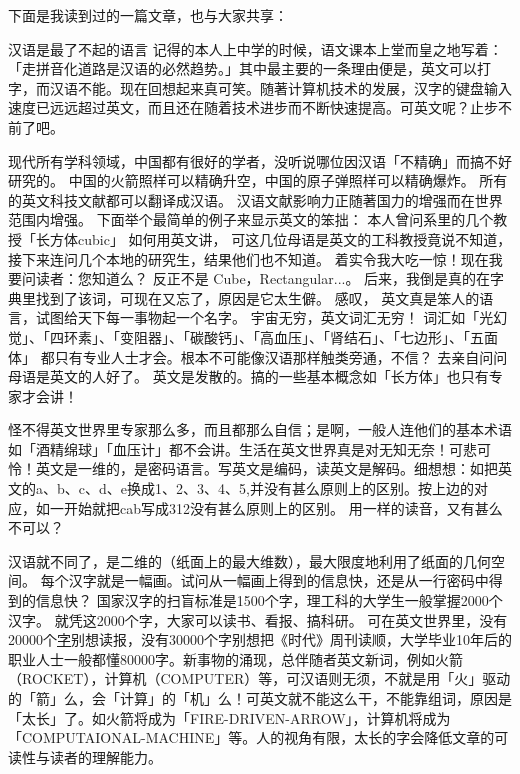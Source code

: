 \documentclass{ctexart}
\begin{document}
下面是我读到过的一篇文章，也与大家共享： 

汉语是最了不起的语言
记得的本人上中学的时候，语文课本上堂而皇之地写着：「走拼音化道路是汉语的必然趋势。」其中最主要的一条理由便是，英文可以打字，而汉语不能。现在回想起来真可笑。随著计算机技术的发展，汉字的键盘输入速度已远远超过英文，而且还在随着技术进步而不断快速提高。可英文呢？止步不前了吧。

现代所有学科领域，中国都有很好的学者，没听说哪位因汉语「不精确」而搞不好研究的。
中国的火箭照样可以精确升空，中国的原子弹照样可以精确爆炸。
所有的英文科技文献都可以翻译成汉语。
汉语文献影响力正随著国力的增强而在世界范围内增强。
下面举个最简单的例子来显示英文的笨拙：
本人曾问系里的几个教授「长方体cubic」  如何用英文讲，
可这几位母语是英文的工科教授竟说不知道，
接下来连问几个本地的研究生，结果他们也不知道。
着实令我大吃一惊！现在我要问读者：您知道么？
反正不是 Cube，Rectangular...。
后来，我倒是真的在字典里找到了该词，可现在又忘了，原因是它太生僻。
感叹， 英文真是笨人的语言，试图给天下每一事物起一个名字。
宇宙无穷，英文词汇无穷！
词汇如「光幻觉」、「四环素」、「变阻器」、「碳酸钙」、「高血压」、「肾结石」、「七边形」、「五面体」
都只有专业人士才会。根本不可能像汉语那样触类旁通，不信？
去亲自问问母语是英文的人好了。
英文是发散的。搞的一些基本概念如「长方体」也只有专家才会讲！

怪不得英文世界里专家那么多，而且都那么自信；是啊，一般人连他们的基本术语如「酒精绵球」「血压计」都不会讲。生活在英文世界真是对无知无奈！可悲可怜！英文是一维的，是密码语言。写英文是编码，读英文是解码。细想想：如把英文的a、b、c、d、e换成1、2、3、4、5,并没有甚么原则上的区别。按上边的对应，如一开始就把cab写成312没有甚么原则上的区别。
用一样的读音，又有甚么不可以？

汉语就不同了，是二维的（纸面上的最大维数），最大限度地利用了纸面的几何空间。
每个汉字就是一幅画。试问从一幅画上得到的信息快，还是从一行密码中得到的信息快？
国家汉字的扫盲标准是1500个字，理工科的大学生一般掌握2000个汉字。
就凭这2000个字，大家可以读书、看报、搞科研。
可在英文世界里，没有20000个\underline{字}别想读报，没有30000个字别想把《时代》周刊读顺，大学毕业10年后的职业人士一般都懂80000字。新事物的涌现，总伴随者英文新词，例如火箭（ROCKET），计算机（COMPUTER）等，可汉语则无须，不就是用「火」驱动的「箭」么，会「计算」的「机」么！可英文就不能这么干，不能靠组词，原因是「太长」了。如火箭将成为「FIRE-DRIVEN-ARROW」，计算机将成为「COMPUTAIONAL-MACHINE」等。人的视角有限，太长的字会降低文章的可读性与读者的理解能力。
\end{document}
